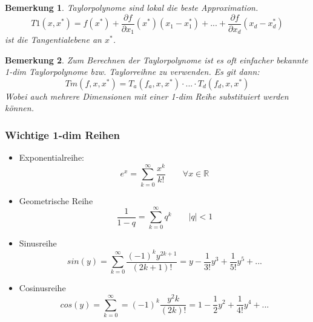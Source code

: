 \documentclass[12pt,a4paper]{report}%
\newtheorem{bem}{Bemerkung}[section]
\numberwithin{equation}{section}
\newcommand{\R}{\mathbb{R}} %
\def\dfp#1#2{\frac{\partial #1}{\partial #2}}
\numberwithin{equation}{subsection}
\begin{document}
  \begin{bem}
    Taylorpolynome sind lokal die beste Approximation.
    \begin{equation}
      T1(x, x^*) = f(x^*) + \dfp{f}{x_1}(x^*)(x_1-x_1^*) + ... + \dfp{f}{x_d}(x_d-x_d^*)
    \end{equation}
    ist die Tangentialebene an $x^*$.
  \end{bem}
  
  \begin{bem}
    Zum Berechnen der Taylorpolynome ist es oft einfacher bekannte 1-dim Taylorpolynome bzw. Taylorreihne zu verwenden. Es git dann:
    \begin{equation}
      Tm(f, x, x^*) = T_a(f_a, x, x^*) \cdot ... \cdot T_d(f_d, x, x^*)
    \end{equation}
    Wobei auch mehrere Dimensionen mit einer 1-dim Reihe substituiert werden können.
  \end{bem}
  
  \subsubsection{Wichtige 1-dim Reihen}
  \begin{itemize}
    \item Exponentialreihe:
    \begin{equation}
      e^x = \sum\limits_{k=0}^\infty \frac{x^k}{k!} \qquad \forall x \in \R
    \end{equation}
    \item Geometrische Reihe
    \begin{equation}
      \frac{1}{1-q} = \sum\limits_{k = 0}^\infty q^k \qquad |q| < 1
    \end{equation}
    \item Sinusreihe
    \begin{equation}
      sin(y) = \sum\limits_{k = 0}^\infty \frac{(-1)^k y^{2k+1}}{(2k+1)!} = y -\frac{1}{3!}y^3 + \frac{1}{5!}y^5 + ...
    \end{equation}
    \item Cosinusreihe
    \begin{equation}
      cos(y) = \sum\limits_{k = 0}^\infty = (-1)^k \frac{y^2k}{(2k)!} = 1 - \frac{1}{2}y^2 + \frac{1}{4!}y^4 + ...
    \end{equation}
  \end{itemize}
  
\end{document}
